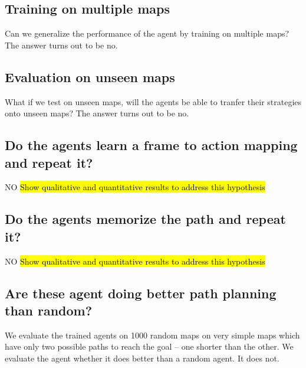 \subsection{Training on multiple maps}
Can we generalize the performance of the agent by training on multiple maps? The answer turns out to be no.

\subsection{Evaluation on unseen maps}
What if we test on unseen maps, will the agents be able to tranfer their strategies onto unseen maps? The answer turns out to be no.

\subsection{Do the agents learn a frame to action mapping and repeat it?}
NO
\hl{Show qualitative and quantitative results to address this hypothesis}

\subsection{Do the agents memorize the path and repeat it?}
NO
\hl{Show qualitative and quantitative results to address this hypothesis}

\subsection{Are these agent doing better path planning than random?}
We evaluate the trained agents on 1000 random maps on very simple maps which have only two possible paths to reach the goal -- one shorter than the other. We evaluate the agent whether it does better than a random agent.
It does not.

